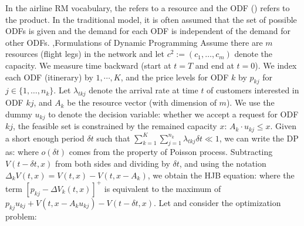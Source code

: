 \documentclass[10pt]{report}
\begin{document}
In the airline RM vocabulary, the  refers to a resource and the ODF () refers to the product. In the traditional model, it is often assumed that
the set of possible ODFs is given and the demand for each ODF is independent of the demand for other ODFs.
\sep{Formulations of Dynamic Programming}
Assume there are $m$ resources (flight legs) in the network and let $c^2:=(c_1,\ldots,c_m)$ denote the capacity. We measure time backward (start at $t=T$ and end at $t=0$).
We index each ODF (itinerary) by $1,\cdots, K$, and the price levels for ODF $k$ by $p_{kj}$ for $j\in\{1,\ldots,n_k\}$. Let $\lambda_{tkj}$ denote the
arrival rate at time $t$ of customers interested in ODF $kj$, and $A_k$ be the resource vector (with dimension of $m$). We use the dummy $u_{kj}$ to denote the decision variable: whether we
accept a request for ODF $kj$, the feasible set is constrained by the remained capacity $x$: $A_k \cdot u_{kj} \le x$. Given a short enough period $\delta t$ such that $\sum_{k=1}^K\sum_{j=1}^{n_k}\lambda_{tkj}\delta t \ll 1$, we can write the DP as:
where $o(\delta t)$ comes from the property of Poisson process. Subtracting $V(t-\delta t,x)$ from both sides and dividing by $\delta t$, and using the notation
$\Delta_kV(t,x)=V(t,x)-V(t,x-A_k)$, we obtain the HJB equation:
where the term $[p_{kj}-\Delta V_k(t,x)]^+$ is equivalent to the maximum of $p_{kj}u_{kj}+V(t,x-A_ku_{kj})-V(t-\delta t,x)$. Let
and consider the optimization problem:
\end{document}
